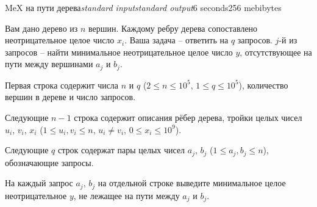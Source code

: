 
\begin{problem}{MeX на пути дерева}{\textsl{standard input}}{\textsl{standard output}}{6 seconds}{256 mebibytes}

Вам дано дерево из $n$ вершин. Каждому ребру дерева сопоставлено неотрицательное целое число $x_i$. 
Ваша задача -- ответить на $q$ запросов. $j$-й из запросов -- найти
минимальное неотрицательное целое число $y$, отсутствующее на пути между вершинами $a_j$ и $b_j$.

\InputFile

Первая строка содержит числа $n$ и $q$ ($2 \leq n \leq 10^5$, $1 \leq q \leq 10^5$), количество вершин в дереве и число запросов.

Следующие $n - 1$ строка содержит описания рёбер дерева, тройки целых чисел $u_i$, $v_i$, $x_i$ ($1 \leq u_i, v_i \leq n$, $u_i \neq v_i$, $0 \leq x_i \leq  10^9$).

Следующие $q$ строк содержат пары целых чисел $a_j$, $b_j$ ($1 \leq a_j, b_j \leq n$), обозначающие запросы.

\OutputFile

На каждый запрос $a_j$, $b_j$ на отдельной строке выведите минимальное целое неотрицательное $y$, не лежащее на пути между $a_j$ и $b_j$.

\Example

\begin{example}
%
\end{example}

\end{problem}
